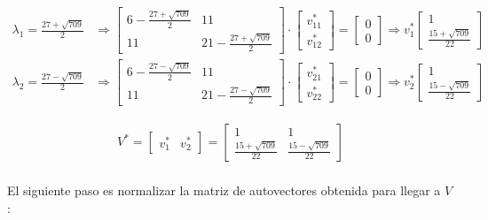 \documentclass[a4paper, spanish]{article}
\begin{document}
  \begin{align}
    \lambda_1 = \frac{27 + \sqrt{709}}{2} &\Rightarrow
    \begin{bmatrix}
      6 - \frac{27 + \sqrt{709}}{2} & 11\\
      11 & 21 - \frac{27 + \sqrt{709}}{2}
    \end{bmatrix}
    \cdot
    \begin{bmatrix}
      v_{11}^* \\
      v_{12}^*
    \end{bmatrix}
    =
    \begin{bmatrix}
      0 \\
      0
    \end{bmatrix}
    \Rightarrow
    v_1^*
    \begin{bmatrix}
      1 \\
      \frac{15 + \sqrt{709}}{22}
    \end{bmatrix} \\
    \lambda_2 = \frac{27 - \sqrt{709}}{2} &\Rightarrow
    \begin{bmatrix}
      6 - \frac{27 - \sqrt{709}}{2} & 11\\
      11 & 21 - \frac{27 - \sqrt{709}}{2}
    \end{bmatrix}
    \cdot
    \begin{bmatrix}
      v_{21}^* \\
      v_{22}^*
    \end{bmatrix}
    =
    \begin{bmatrix}
      0 \\
      0
    \end{bmatrix}
    \Rightarrow
    v_2^*
    \begin{bmatrix}
      1 \\
      \frac{15 - \sqrt{709}}{22}
    \end{bmatrix}
  \end{align}


  \begin{align}
    V^* =
    \begin{bmatrix}
      v_1^* & v_2^*
    \end{bmatrix} =
    \begin{bmatrix}
      1 & 1 \\
      \frac{15 + \sqrt{709}}{22}  & \frac{15 - \sqrt{709}}{22}
    \end{bmatrix}
  \end{align}

  \paragraph{}
  El siguiente paso es normalizar la matriz de autovectores obtenida para llegar a $V$:
\end{document}

